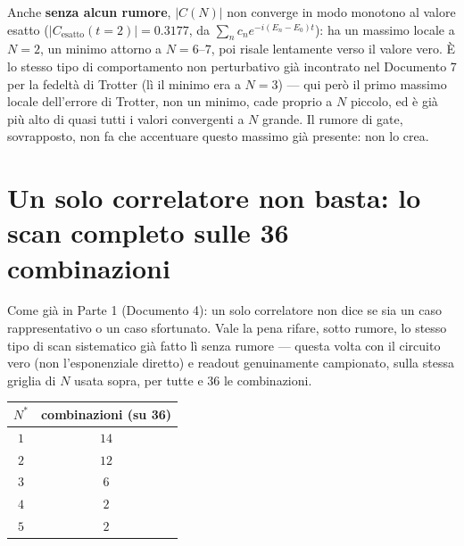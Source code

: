\documentclass[11pt,a4paper]{article}
\begin{document}
\FloatBarrier

Anche \textbf{senza alcun rumore}, $|C(N)|$ non converge in modo monotono al
valore esatto ($|C_\text{esatto}(t{=}2)|=0.3177$, da $\sum_n c_n
e^{-i(E_n-E_0)t}$): ha un massimo locale a $N=2$, un minimo attorno a
$N=6$--$7$, poi risale lentamente verso il valore vero. È lo stesso tipo di
comportamento non perturbativo già incontrato nel Documento 7 per la fedeltà
di Trotter (lì il minimo era a $N=3$) --- qui però il primo massimo locale
dell'errore di Trotter, non un minimo, cade proprio a $N$ piccolo, ed è già
più alto di quasi tutti i valori convergenti a $N$ grande. Il rumore di gate,
sovrapposto, non fa che accentuare questo massimo già presente: non lo crea.


\section{Un solo correlatore non basta: lo scan completo sulle 36 combinazioni}
\label{sec:scan36}

Come già in Parte 1 (Documento 4): un solo correlatore non dice se sia un
caso rappresentativo o un caso sfortunato. Vale la pena rifare, sotto
rumore, lo stesso tipo di scan sistematico già fatto lì senza rumore ---
questa volta con il circuito vero (non l'esponenziale diretto) e readout
genuinamente campionato, sulla stessa griglia di $N$ usata sopra, per
tutte e $36$ le combinazioni.


\begin{center}
\renewcommand{\arraystretch}{1.2}
\begin{tabular}{@{}cc@{}}
\toprule
$N^*$ & combinazioni (su 36)\\
\midrule
$1$ & $14$\\
$2$ & $12$\\
$3$ & $6$\\
$4$ & $2$\\
$5$ & $2$\\
\bottomrule
\end{tabular}
\end{center}
\end{document}
